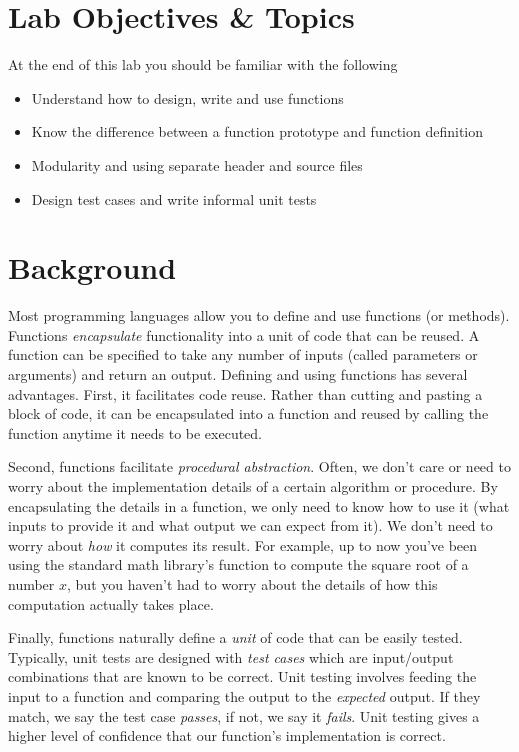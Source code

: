 \documentclass[12pt]{scrartcl}
\begin{document}
\section{Lab Objectives \& Topics}
At the end of this lab you should be familiar with the following
\begin{itemize}
  \item Understand how to design, write and use functions
  \item Know the difference between a function prototype and function definition
  \item Modularity and using separate header and source files
  \item Design test cases and write informal unit tests
\end{itemize}

\section{Background}

Most programming languages allow you to define and use functions 
(or methods).  Functions \emph{encapsulate} functionality into a 
unit of code that can be reused.  A function can be specified to 
take any number of inputs (called parameters or arguments) and 
return an output.  Defining and using functions has several advantages.  
First, it facilitates code reuse.  Rather than 
cutting and pasting a block of code, it can be encapsulated 
into a function and reused by calling the function anytime it needs 
to be executed.

Second, functions facilitate \emph{procedural abstraction}.  Often, 
we don't care or need to worry about the implementation 
details of a certain algorithm or procedure.  By encapsulating the 
details in a function, we only need to know how to use it (what 
inputs to provide it and what output we can expect from it).  We
don't need to worry about \emph{how} it computes its result.  For example,
up to now you've been using the standard math library's function
to compute the square root of a number $x$, but you haven't
had to worry about the details of how this computation actually
takes place.

Finally, functions naturally define a \emph{unit} of code that can
be easily tested.  Typically, unit tests are designed with 
\emph{test cases} which are input/output combinations that are
known to be correct.  Unit testing involves feeding the input to
a function and comparing the output to the \emph{expected} output.
If they match, we say the test case \emph{passes}, if not, we say
it \emph{fails}.  Unit testing gives a higher level of confidence
that our function's implementation is correct.
\end{document}
